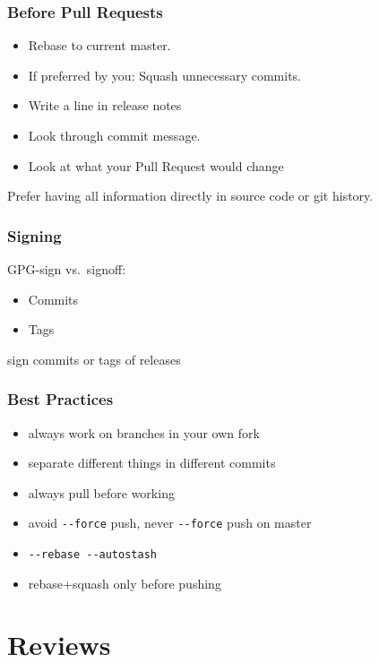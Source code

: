 \begin{frame}
	\frametitle{Before Pull Requests}

	\begin{itemize}
		\item Rebase to current master.
		\item If preferred by you: Squash unnecessary commits.
		\item Write a line in release notes
		\item Look through commit message.
		\item Look at what your Pull Request would change
	\end{itemize}

	\begin{finding}
	Prefer having all information directly in source code or git history.
	\end{finding}
\end{frame}

\begin{frame}
	\frametitle{Signing}

	GPG-sign vs.\ signoff:
	\begin{itemize}
		\item Commits
		\item Tags
	\end{itemize}

	\begin{finding}
	sign commits or tags of releases
	\end{finding}
\end{frame}

\begin{frame}[fragile]
	\frametitle{Best Practices}
	\begin{itemize}
		\item always work on branches in your own fork
		\item separate different things in different commits
		\item always pull before working
		\item avoid \verb+--force+ push, never \verb+--force+ push on master
		\item \verb+--rebase --autostash+
		\item rebase+squash only before pushing
	\end{itemize}
\end{frame}


\section{Reviews}

